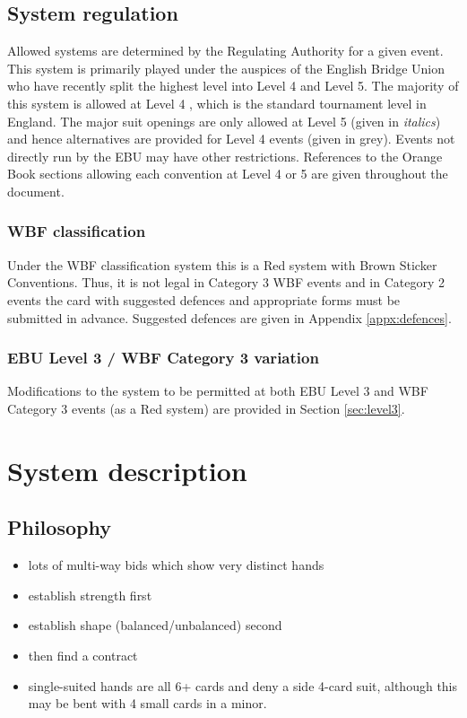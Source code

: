 \documentclass[a4paper,14pt]{extarticle}
\begin{document}
\subsection{System regulation}

Allowed systems are determined by the Regulating Authority for a given event.
This system is primarily played under the auspices of the English Bridge Union
who have recently split the highest level into Level 4 and Level 5. The
majority of this system is allowed at Level 4 , which is the
standard tournament level in England. The major suit openings are only allowed
at Level 5  (given in {\it italics}) and hence alternatives are
provided for Level 4 events (given in {\color{CadetBlue}grey}).  Events not
directly run by the EBU may have other restrictions.  References to the Orange
Book sections allowing each convention at Level 4 or 5 are given throughout the
document.

\subsubsection{WBF classification}

Under the WBF classification system this is a Red system with Brown Sticker
Conventions. Thus, it is not legal in Category 3 WBF events and in Category 2
events the card with suggested defences and appropriate forms must be submitted
in advance. Suggested defences are given in Appendix \ref{appx:defences}.

\subsubsection{EBU Level 3 / WBF Category 3 variation}

Modifications to the system to be permitted at both EBU Level 3 and WBF
Category 3 events (as a Red system) are provided in Section \ref{sec:level3}.

\newpage

\section{System description}
\label{sec:system}

\subsection{Philosophy}
\label{sec:philosophy}

\begin{itemize}
\item lots of multi-way bids which show very distinct hands
\item establish strength first
\item establish shape (balanced/unbalanced) second
\item then find a contract
\item single-suited hands are all 6+ cards and deny a side 4-card suit, although
this may be bent with 4 small cards in a minor.
\end{itemize}
\end{document}
